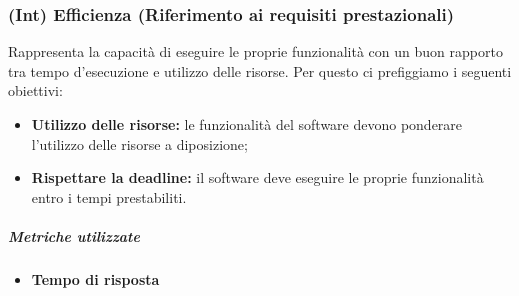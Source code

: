 \subsubsection{(Int) Efficienza (Riferimento ai requisiti prestazionali)}
Rappresenta la capacità di eseguire le proprie funzionalità con un buon rapporto tra tempo d'esecuzione e utilizzo delle risorse. Per questo ci prefiggiamo i seguenti obiettivi:
\begin{itemize}
	\item \textbf{Utilizzo delle risorse:} le funzionalità del software devono ponderare l'utilizzo delle risorse a diposizione;
	\item \textbf{Rispettare la deadline:} il software deve eseguire le proprie funzionalità entro i tempi prestabiliti.
\end{itemize}
\vspace{0.8cm}
\subparagraph{Metriche utilizzate}
\begin{itemize}
	\item \textbf{Tempo di risposta}
\end{itemize}
\begin{table}[!htpb]
	\centering
	\renewcommand{\arraystretch}{2} 
	\caption{TBD}
\end{table}

